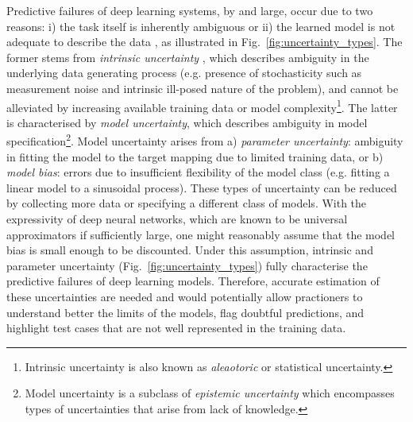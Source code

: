 Predictive failures of deep learning systems, by and large, occur due to two reasons: i) the task itself is inherently ambiguous or ii) the learned model is not adequate to describe the data  \cite{hora1996aleatory,der2009aleatory,tanno2017bayesian,kendall2017uncertainties}, as illustrated in Fig.~\ref{fig:uncertainty_types}. The former stems from \emph{intrinsic uncertainty} \cite{wang1996intrinsic}, which describes ambiguity in the underlying data generating process  (e.g. presence of stochasticity such as measurement noise and intrinsic ill-posed nature of the problem), and cannot be alleviated by increasing available training data or model complexity\footnote{Intrinsic uncertainty is also known as \textit{aleaotoric} or statistical uncertainty.}. The latter is characterised by \textit{model uncertainty}\cite{draper1995assessment}, which describes ambiguity in model specification\footnote{Model uncertainty is a subclass of \textit{epistemic uncertainty} \cite{hora1996aleatory} which encompasses types of uncertainties that arise from lack of knowledge. }. Model uncertainty arises from a) \textit{parameter uncertainty}: ambiguity in fitting the model to the target mapping due to limited training data, or b) \textit{model bias}: errors due to insufficient flexibility of the model class (e.g. fitting a linear model to a sinusoidal process). These types of uncertainty can be reduced by collecting more data or specifying a different class of models. With the expressivity of deep neural networks, which are known to be universal approximators \cite{cybenko1989approximation} if sufficiently large, one might reasonably assume that the model bias is small enough to be discounted. Under this assumption, intrinsic and parameter uncertainty (Fig.~\ref{fig:uncertainty_types}) fully characterise the predictive failures of deep learning models. Therefore, accurate estimation of these uncertainties are needed and would potentially allow practioners to understand better the limits of the models, flag doubtful predictions, and highlight test cases that are not well represented in the training data.



